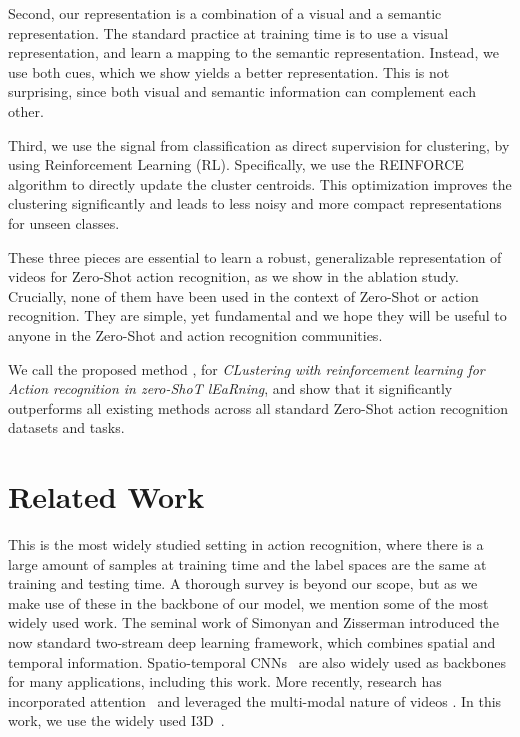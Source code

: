 \documentclass[runningheads]{llncs}
\begin{document}
Second, our representation is a combination of a visual and a semantic representation. The standard practice at training time is to use a visual representation, and learn a mapping to the semantic representation. Instead, we use both cues, which we show yields a better representation. This is not surprising, since both visual and semantic information can complement each other. 



Third, we use the signal from classification as direct supervision for clustering, by using Reinforcement Learning (RL). Specifically, we use the REINFORCE algorithm to directly update the cluster centroids.
This optimization improves the clustering significantly and leads to less noisy and more compact representations for unseen classes.

These three pieces are essential to learn a robust, generalizable representation of videos for Zero-Shot action recognition, as we show in the ablation study. Crucially, none of them have been used in the context of Zero-Shot or action recognition. They are simple, yet fundamental and we hope they will be useful to anyone in the Zero-Shot and action recognition communities. 

We call the proposed method \MethodName, for \emph{CLustering with reinforcement learning for Action recognition in zero-ShoT lEaRning}, and show that it significantly outperforms all existing methods across all standard Zero-Shot action recognition datasets and tasks. 



















\section{Related Work}




This is the most widely studied setting in action recognition, where there is a large amount of samples at training time and the label spaces are the same at training and testing time. A thorough survey is beyond our scope, but as we make use of these in the backbone of our model, we mention some of the most widely used work. The seminal work of Simonyan and Zisserman \cite{simonyan2014two} introduced the now standard two-stream deep learning framework, which combines spatial and temporal information. Spatio-temporal CNNs~\cite{tran2015learning,qiu2017learning,i3d} are also widely used as backbones for many applications, including this work. More recently, research has incorporated attention~\cite{wang2018non,girdhar2017attentional} and leveraged the multi-modal nature of videos \cite{alwassel2019self}. In this work, we use the widely used I3D~\cite{i3d}. 
\\
\end{document}
